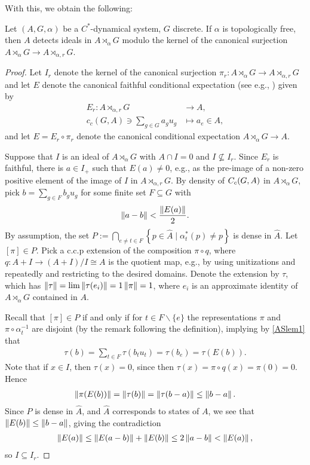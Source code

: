 With this, we obtain the following:
\begin{theorem}
	Let $(A,G,\alpha)$ be a $C^*$-dynamical system, $G$ discrete. If $\alpha$ is topologically free, then $A$ detects ideals in $A \rtimes_\alpha G$ modulo the kernel of the canonical surjection $A \rtimes_\alpha G \to A \rtimes_{\alpha,r}G$.
	\label{ASthm1}
\end{theorem}
\begin{proof}
	Let $I_r$ denote the kernel of the canonical surjection $ \pi_r \colon A \rtimes_\alpha G \to A \rtimes_{\alpha , r}G$ and let $E$ denote the canonical faithful conditional expectation (see e.g., \cite[Proposition 4.1.9]{brown2008c}) given by
	\begin{align*}
	E_r \colon A \rtimes_{\alpha,r} G &\to A, \\ 
		c_c(G,A) \ni \sum_{g \in G} a_g  u_g &\mapsto a_e \in A,
	\end{align*}
	and let $E = E_r \circ \pi_r$ denote the canonical conditional expectation $A \rtimes_{\alpha }G \to A$.
	
	Suppose that $I$ is an ideal of $A \rtimes_\alpha G$ with $A \cap I=0$ and $I \not \subseteq I_r$. Since $E_r$ is faithful, there is $a \in I_+$ such that $E(a) \neq 0$, e.g., as the pre-image of a non-zero positive element of the image of $I$ in $A \rtimes_{\alpha,r}G$. By density of $C_c(G,A)$ in $A \rtimes_\alpha G$, pick $b = \sum_{g \in F} b_g u_g$ for some finite set $F \subseteq G$ with
	\begin{align*}
		\left\lVert a - b \right\rVert < \frac{\left\lVert E (a) \right\rVert}{2}.
	\end{align*}
	By assumption, the set $P := \bigcap_{e \neq t \in F}\left\{ p \in \hat A \mid \alpha_{t}^*(p) \neq p \right\}$ is dense in $\hat A$. Let $[\pi] \in P$. Pick a c.c.p extension of the composition $\pi \circ q$, where $q \colon A+I \to (A+I)/I\cong A$ is the quotient map, e.g., by using unitizations and \cite[Proposition 2.2.1]{brown2008c} repeatedly and restricting to the desired domains. Denote the extension by $\tau$, which has $\left\lVert \tau \right\rVert = \lim \left\lVert \tau(e_i)\right\rVert = 1\left\lVert \pi \right\rVert = 1$, where $e_i$ is an approximate identity of $A \rtimes_\alpha G$ contained in $A$. 
	
	Recall that $[\pi] \in P$ if and only if for $t \in F\backslash\{e\}$ the representations $\pi$ and $\pi \circ \alpha_{t}^{-1}$ are disjoint (by the remark following the definition), implying by \cref{ASlem1} that
	\begin{align*}
		\tau(b) = \sum_{t \in F} \tau(b_t u_t) = \tau(b_e) = \tau(E(b)).
	\end{align*}
	Note that if $x \in I$, then $\tau(x) = 0$, since then $\tau(x) = \pi \circ q(x) = \pi(0) =0$. Hence
	\begin{align*}
		\left\lVert \pi(E(b))\right\rVert = \left\lVert \tau(b) \right\rVert = \left\lVert \tau(b-a)\right\rVert \leq \left\lVert b-a\right\rVert.
	\end{align*}
	Since $P$ is dense in $\hat A$, and $\hat A$ corresponds to states of $A$, we see that $\left\lVert E(b)\right\rVert \leq \left\lVert b-a\right\rVert$, giving the contradiction
	\begin{align*}
		\left\lVert E(a) \right\rVert \leq \left\lVert E(a-b)\right\rVert + \left\lVert E(b)\right\rVert \leq 2 \left\lVert a-b\right\rVert <  \left\lVert E(a)\right\rVert,
	\end{align*}
	so $I \subseteq I_r$.
\end{proof}
